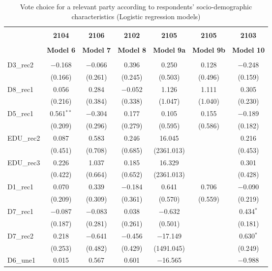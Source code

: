 \documentclass[
]{article}
\begin{document}
\begin{table}[!htbp] \centering 
  \caption{Vote choice for a relevant party according to respondents' 
                       socio-demographic characteristics (Logistic regression models)} 
  \label{table:full_logit_pl} 
\begin{tabular}{@{\extracolsep{5pt}}lcccccc} 
\\[-1.8ex]\hline \\[-1.8ex] 
 & \textbf{2104} & \textbf{2106} & \textbf{2102} & \textbf{2105} & \textbf{2105} & \textbf{2103} \\ 
\\[-1.8ex] & \textbf{Model 6} & \textbf{Model 7} & \textbf{Model 8} & \textbf{Model 9a} & \textbf{Model 9b} & \textbf{Model 10}\\ 
\hline \\[-1.8ex] 
 D3\_rec2 & $-$0.168 & $-$0.066 & 0.396 & 0.250 & 0.128 & $-$0.248 \\ 
  & (0.166) & (0.261) & (0.245) & (0.503) & (0.496) & (0.159) \\ 
  D8\_rec1 & 0.056 & 0.284 & $-$0.052 & 1.126 & 1.111 & 0.305 \\ 
  & (0.216) & (0.384) & (0.338) & (1.047) & (1.040) & (0.230) \\ 
  D5\_rec1 & 0.561$^{**}$ & $-$0.304 & 0.177 & 0.105 & 0.155 & $-$0.189 \\ 
  & (0.209) & (0.296) & (0.279) & (0.595) & (0.586) & (0.182) \\ 
  EDU\_rec2 & 0.087 & 0.583 & 0.246 & 16.045 &  & 0.216 \\ 
  & (0.451) & (0.708) & (0.685) & (2361.013) &  & (0.453) \\ 
  EDU\_rec3 & 0.226 & 1.037 & 0.185 & 16.329 &  & 0.301 \\ 
  & (0.422) & (0.664) & (0.652) & (2361.013) &  & (0.428) \\ 
  D1\_rec1 & 0.070 & 0.339 & $-$0.184 & 0.641 & 0.706 & $-$0.090 \\ 
  & (0.209) & (0.309) & (0.361) & (0.570) & (0.559) & (0.219) \\ 
  D7\_rec1 & $-$0.087 & $-$0.083 & 0.038 & $-$0.632 &  & 0.434$^{*}$ \\ 
  & (0.187) & (0.281) & (0.261) & (0.501) &  & (0.181) \\ 
  D7\_rec2 & 0.218 & $-$0.641 & $-$0.456 & $-$17.149 &  & 0.630$^{*}$ \\ 
  & (0.253) & (0.482) & (0.429) & (1491.045) &  & (0.249) \\ 
  D6\_une1 & 0.015 & 0.567 & 0.601 & $-$16.565 &  & $-$0.988 \\ 

\end{tabular}
\end{table}
\end{document}
